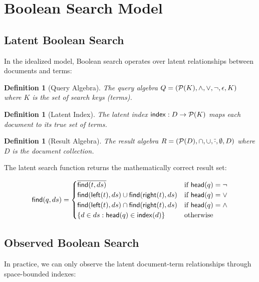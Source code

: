 \documentclass[11pt,final,hidelinks]{article}
\newtheorem{definition}[theorem]{Definition}
\newcommand{\Find}{\mathsf{find}}     %
\newcommand{\MakeIndex}{\mathsf{index}}
\newcommand{\Head}{\mathsf{head}}
\newcommand{\Left}{\mathsf{left}}
\newcommand{\Right}{\mathsf{right}}
\begin{document}
\section{Boolean Search Model}

\subsection{Latent Boolean Search}

In the idealized model, Boolean search operates over latent relationships between documents and terms:

\begin{definition}[Query Algebra]
The query algebra $Q = (\mathcal{P}(K), \land, \lor, \neg, \epsilon, K)$ where $K$ is the set of search keys (terms).
\end{definition}

\begin{definition}[Latent Index]
The latent index $\MakeIndex : D \to \PS{K}$ maps each document to its true set of terms.
\end{definition}

\begin{definition}[Result Algebra]
The result algebra $R = (\mathcal{P}(D), \cap, \cup, \overline{\cdot}, \emptyset, D)$ where $D$ is the document collection.
\end{definition}

The latent search function returns the mathematically correct result set:

\begin{equation}
\Find(q, ds) = \begin{cases}
    \SetComplement{\Find(t, ds)} & \text{if } \Head(q) = \neg \\
    \Find(\Left(t), ds) \cup \Find(\Right(t), ds) & \text{if } \Head(q) = \lor \\
    \Find(\Left(t), ds) \cap \Find(\Right(t), ds) & \text{if } \Head(q) = \land \\
    \{d \in ds : \Head(q) \in \MakeIndex(d)\} & \text{otherwise}
\end{cases}
\end{equation}

\subsection{Observed Boolean Search}

In practice, we can only observe the latent document-term relationships through space-bounded indexes:
\end{document}
